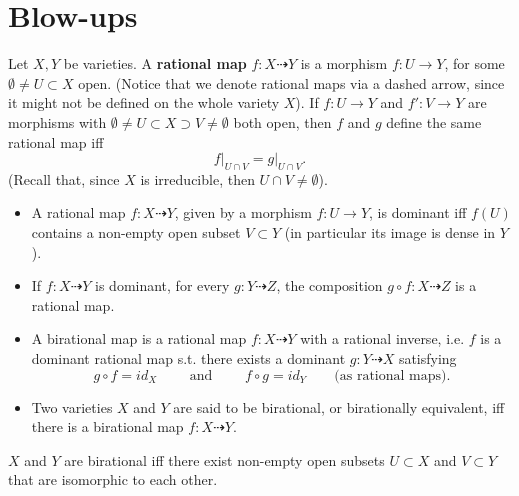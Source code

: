 \section{Blow-ups}

\begin{defn}
	Let $X,Y$ be varieties.
	A \textbf{rational map} $f: X \dashrightarrow Y$ is a morphism $f: U \to Y$, for some
	$\emptyset \neq U \subset X$ open.
	(Notice that we denote rational maps via a dashed arrow, since it might not be defined on the whole variety $X$).
	If $f: U \to Y$ and $f': V \to Y$ are morphisms with
	$\emptyset \neq U \subset X \supset V \neq \emptyset$ both open, then
	$f$ and $g$ define the same rational map iff
	\begin{equation}
	\left.f\right|_{U \cap V} = \left.g\right|_{U \cap V} 
	.\end{equation} 
	(Recall that, since $X$ is irreducible, then $U \cap V \neq \emptyset$).
\end{defn}

\begin{defn}[]\leavevmode\vspace{-.2\baselineskip}
	\begin{itemize}
		\item A rational map $f: X \dashrightarrow Y$, given by a morphism $f: U \to Y$, 
			is dominant iff $f(U)$ contains a non-empty open subset $V \subset Y$
			(in particular its image is dense in $Y$).
		\item If $f: X \dashrightarrow Y$ is dominant, for every $g: Y \dashrightarrow Z$, 
			the composition $g \circ f: X \dashrightarrow Z$ is a rational map.
		\item A birational map is a rational map $f: X \dashrightarrow Y$ with a rational inverse,
			i.e. $f$ is a dominant rational map s.t. there exists a dominant $g: Y \dashrightarrow X$ satisfying
			\begin{equation}
			g \circ f = id_X \qquad \text{ and } \qquad
			f \circ g = id_Y \qquad
			\text{(as rational maps)}
			.\end{equation} 
		\item Two varieties $X$ and $Y$ are said to be birational,
			or birationally equivalent, iff there is a birational map 
			$f: X \dashrightarrow Y$.
	\end{itemize}
\end{defn}

\begin{thm}[]
$X$ and $Y$ are birational iff there exist non-empty open subsets
$U \subset X$ and $V \subset Y$ that are isomorphic to each other.
\end{thm}

